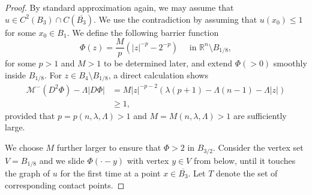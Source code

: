 \documentclass[11pt]{amsart}
\theoremstyle{plain}
\theoremstyle{definition}
\numberwithin{equation}{section}
\begin{document}
\begin{proof}
By standard approximation again, we may assume that $u\in C^2(B_3)\cap C(\overline{B_3})$. We use the contradiction by assuming that $u(x_0) \leq 1$ for some $x_0 \in B_{1}$.
We define the following barrier function
\begin{equation*}
    \Phi(z) =  \frac{M}{p}(|z|^{-p}-2^{-p}) \quad \text { in } \mathbb{R}^n\setminus B_{1/8},
\end{equation*}
for some $p>1$ and $M>1$ to be determined later, and extend $\Phi (>0)$ smoothly inside $B_{1/8}$. For $z \in B_4\setminus B_{1/8}$, a direct calculation shows
\begin{equation} 
\begin{aligned}\label{barrierPDE}
    \mathcal{M}^-(D^2\Phi) -\Lambda|D\Phi| &= M |z|^{-p-2}(\lambda(p+1)- \Lambda(n-1) - \Lambda|z|) \\
    &\geq 1, 
\end{aligned}    
\end{equation}
provided that $p=p(n,\lambda,\Lambda)>1$ and $M=M(n,\lambda,\Lambda)>1$ are sufficiently large.

We choose $M$ further larger to ensure that $\Phi >2$ in $B_{3/2}$.
Consider the vertex set $V = B_{1/8}$ and we slide $\Phi(\cdot-y)$ with vertex $y \in V$ from below, until it touches the graph of $u$ for the first time at a point $x \in \overline{B_3}$. Let $T$ denote the set of corresponding contact points.


\end{proof}
\end{document}
